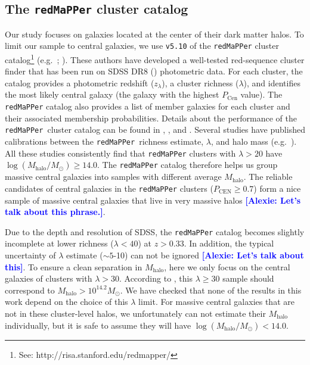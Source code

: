 \documentclass[a4paper,fleqn,usenatbib]{mnras}
\def\redm{\texttt{redMaPPer}}
\def\mhalo{{$M_{\mathrm{halo}}$}}
\newcommand{\alexie}[1]{\textcolor{blue}{\textbf{[Alexie: #1]}}}
\begin{document}
\subsection{The \redm{}{} cluster catalog}
    \label{ssec:redmapper}
    
    Our study focuses on galaxies located at the center of their dark matter halos. 
    To limit our sample to central galaxies, we use \texttt{v5.10} of the \redm{}{} 
    cluster catalog\footnote{See: http://risa.stanford.edu/redmapper/} 
    (e.g.\ \citealt{Rykoff2014}; \citealt{Rozo2015b}). 
    These authors have developed a well-tested red-sequence cluster finder that has 
    been run on SDSS DR8 (\citealt{SDSSDR8}) photometric data. 
    For each cluster, the catalog provides a photometric redshift ($z_{\lambda}$), a 
    cluster richness ($\lambda$), and identifies the most likely central galaxy (the 
    galaxy with the highest $P_{\mathrm{Cen}}$ value). 
    The \redm{}{} catalog also provides a list of member galaxies for each cluster and 
    their associated membership probabilities. 
    Details about the performance of the \redm{}~cluster catalog can be found in 
    \citet{Rozo2014}, \citet{Rozo2015a}, and \citet{Rozo2015b}. 
    Several studies have published calibrations between the \redm{}~richness estimate, 
    $\lambda$, and halo mass (e.g.\ \citealt{Saro2015, Farahi2016, Simet2016, 
    Melchior2016}). 
    All these studies consistently find that \redm{} clusters with $\lambda > 20$ 
    have $\log (M_{\mathrm{halo}}/M_{\odot}) \geq 14.0$. 
    The \redm{} catalog therefore helps us group massive central galaxies into samples 
    with different average \mhalo{}. 
    The reliable candidates of central galaxies in the \redm{} clusters 
    ($P_{\mathrm{CEN}} \geq 0.7$) form a nice sample of massive central galaxies 
    that live in very massive halos \alexie{Let's talk about this phrase.}. 
    
    Due to the depth and resolution of SDSS, the \redm{} catalog 
    becomes slightly incomplete at lower richness ($\lambda < 40$) at $z > 0.33$. 
    In addition, the typical uncertainty of $\lambda$ estimate ($\sim 5$-10) 
    can not be ignored \alexie{Let's talk about this}. 
    To ensure a clean separation in \mhalo{}, here we only focus on the central galaxies 
    of clusters with $\lambda > 30$. 
    According to \citet{Simet2016}, this $\lambda \geq 30$ sample should correspond to 
    $M_{\mathrm{halo}}>10^{14.2} M_{\odot}$. 
    We have checked that none of the results in this work depend on the choice of this 
    $\lambda$ limit. 
    For massive central galaxies that are not in these cluster-level halos, 
    we unfortunately can not estimate their \mhalo{} individually, but it is safe 
    to assume they will have $\log (M_{\mathrm{halo}}/M_{\odot}) < 14.0$.  
    
\end{document}
